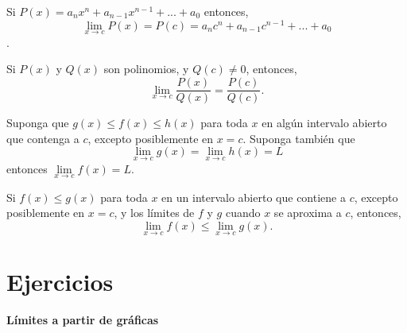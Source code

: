 \begin{tcolorbox}[colframe = white]
    \begin{teo}
	Si $P(x) = a_nx^n + a_{n-1}x^{n-1}+...+a_0$ entonces, 
	$$\lim_{x\to c}P(x) = P(c) = a_nc^n + a_{n-1}c^{n-1} + ... + a_0$$.
    \end{teo}
\end{tcolorbox}

\begin{tcolorbox}[colframe = white]
    \begin{teo}
	Si $P(x)$ y $Q(x)$ son polinomios, y $Q(c)\neq 0$, entonces, $$\lim_{x\to c}\dfrac{P(x)}{Q(x)} = \dfrac{P(c)}{Q(c)}.$$
    \end{teo}
\end{tcolorbox}

\begin{tcolorbox}[colframe = white]
    \begin{teo}
	Suponga que $g(x)\leq f(x)\leq h(x)$ para toda $x$ en algún intervalo abierto que contenga a $c$, excepto posiblemente en $x=c$. Suponga también que $$\lim_{x\to c} g(x) = \lim_{x\to c} h(x) = L$$
	entonces $\lim\limits_{x\to c} f(x) = L$.
    \end{teo}
\end{tcolorbox}

\begin{tcolorbox}[colframe = white]
    \begin{teo} Si $f(x)\leq g(x)$ para toda $x$ en un intervalo abierto que contiene a $c$, excepto posiblemente en $x=c$, y los límites de $f$ y $g$ cuando $x$ se aproxima a $c$, entonces, 
    $$\lim_{x\to c} f(x) \leq \lim_{x\to c} g(x).$$
    \end{teo}
\end{tcolorbox}


\setcounter{section}{1}
\section{Ejercicios}

\textbf{Límites a partir de gráficas}\\

